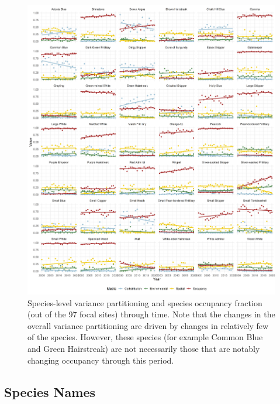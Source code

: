 \documentclass[
]{article}
\begin{document}
\begin{figure}
\centering
\includegraphics{ButterflyMarkdowns/ButterflySIFigs/SpeciesResponses.png}
\caption{Species-level variance partitioning and species occupancy
fraction (out of the 97 focal sites) through time. Note that the changes
in the overall variance partitioning are driven by changes in relatively
few of the species. However, these species (for example Common Blue and
Green Hairstreak) are not necessarily those that are notably changing
occupancy through this period.}
\end{figure}

\newpage

\hypertarget{species-names}{%
\subsection{Species Names}\label{species-names}}
\end{document}
